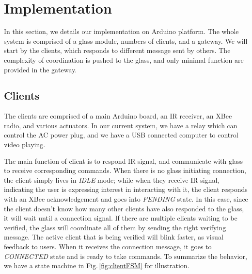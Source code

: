 
\section{Implementation}
\label{sec:implementation}

In this section, we details our implementation on Arduino \cite{Arduino} platform. The whole system is comprised of a glass module, numbers of clients, and a gateway. We will start by the clients, which responds to different message sent by others. The complexity of coordination is pushed to the glass, and only minimal function are provided in the gateway.

\subsection{Clients}
The clients are comprised of a main Arduino board, an IR receiver, an XBee radio, and various actuators. In our current system, we have a relay which can control the AC power plug, and we have a USB connected computer to control video playing. 

The main function of client is to respond IR signal, and communicate with glass to receive corresponding commands. When there is no glass initiating connection, the client simply lives in {\it IDLE} mode; while when they receive IR signal, indicating the user is expressing interest in interacting with it, the client responds with an XBee acknowledgement and goes into {\it PENDING} state. In this case, since the client doesn't know how many other clients have also responded to the glass, it will wait until a connection signal. If there are multiple clients waiting to be verified, the glass will coordinate all of them by sending the right verifying message. The active client that is being verified will blink faster, as visual feedback to users. When it receives the connection message, it goes to {\it CONNECTED} state and is ready to take commands. To summarize the behavior, we have a state machine in Fig.\,\ref{fig:clientFSM} for illustration. 

